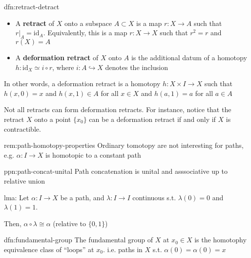 \documentclass{article}
\begin{document}
\newpage

\begin{dfn}{dfn:retract-detract}{}
    \begin{itemize}
        \item A \textbf{retract} of $X$ onto a subspace $A \subset X$ is a map $r : X \to A$ such that $r |_{A} = \mathrm{id}_{A}$. Equivalently, this is a map $r : X \to X$ such that $r^{2} = r$ and $r(X) = A$
        \item A \textbf{deformation retract} of $X$ onto $A$ is the additional datum of a homotopy $h : \mathrm{id}_{X} \simeq i \circ r$, where $i : A \hookrightarrow X$ denotes the inclusion
    \end{itemize}
\end{dfn}

In other words, a deformation retract is a homotopy $h : X \times I \to X$ such that $h(x, 0) = x$ and $h(x, 1)\in A$ for all $x\in X$ and $h(a,1) = a$ for all $a\in A$

Not all retracts can form deformation retracts. For instance, notice that the retract $X$ onto a point $\{x_{0}\}$ can be a deformation retract if and only if $X$ is contractible.



\newpage


\begin{rem}[]{rem:path-homotopy-properties}{}
    Ordinary tomotopy are not interesting for paths, e.g. $\alpha : I \to X$ is homotopic to a constant path
\end{rem}

\begin{ppn}[]{ppn:path-concat-unital}{}
    Path concatenation is unital and asssociative up to relative union
\end{ppn}

\begin{lma}[]{lma:}{}
    Let $\alpha : I \to X$ be a path, and $\lambda : I \to I$ continuous s.t. $\lambda(0) = 0$ and $\lambda(1) = 1$.

    Then, $\alpha \circ \lambda \cong \alpha$ (relative to $\{0,1\}$)
\end{lma}

\begin{dfn}{dfn:fundamental-group}{}
    The fundamental group of $X$ at $x_{0}\in X$ is the homotophy equivalence class of ``loops'' at $x_{0}$. i.e. paths in $X$ s.t. $\alpha(0) = \alpha(0) = x$
\end{dfn}
\end{document}
